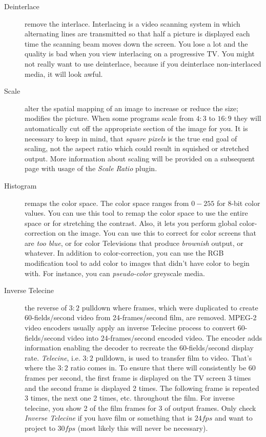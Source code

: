 \begin{description}
    \item[Deinterlace] remove the interlace.  Interlacing is a video scanning system in which alternating lines are transmitted so that half a picture is displayed each time the scanning beam moves down the screen.  You lose a lot and the quality is bad when you view interlacing on a progressive TV.  You might not really want to use deinterlace, because if you deinterlace non-interlaced media, it will look awful.
    \item[Scale] alter the spatial mapping of an image to increase or reduce the size; modifies the picture.  When some programs scale from $4:3$ to $16:9$ they will automatically cut off the appropriate section of the image for you.  It is necessary to keep in mind, that \textit{square pixels} is the true end goal of scaling, not the aspect ratio which could result in squished or stretched output.  More information about scaling will be provided on a subsequent page with usage of the \textit{Scale Ratio} plugin.
    \item[Histogram] remaps the color space.  The color space ranges from $0-255$ for 8-bit color values.  You can use this tool to remap the color space to use the entire space or for stretching the contrast.  Also, it lets you perform global color-correction on the image.  You can use this to correct for color screens that are \textit{too blue}, or for color Televisions that produce \textit{brownish} output, or whatever.  In addition to color-correction, you can use the RGB modification tool to add color to images that didn't have color to begin with.  For instance, you can \textit{pseudo-color} greyscale media.
    \item[Inverse Telecine] the reverse of $3:2$ pulldown where frames, which were duplicated to create 60-fields/second video from 24-frames/second film, are removed.  MPEG-2 video encoders usually apply an inverse Telecine process to convert 60-fields/second video into 24-frames/second encoded video. The encoder adds information enabling the decoder to recreate the 60-fields/second display rate. \textit{Telecine}, i.e. $3:2$ pulldown, is used to transfer film to video. That's where the $3:2$ ratio comes in. To ensure that there will consistently be 60 frames per second, the first frame is displayed on the TV screen 3 times and the second frame is displayed 2 times. The following frame is repeated 3 times, the next one 2 times, etc. throughout the film.  For inverse telecine, you show 2 of the film frames for 3 of output frames.  Only check \textit{Inverse Telecine} if you have film or something that is $24fps$ and want to project to $30fps$ (most likely this will never be necessary).

\end{description}
